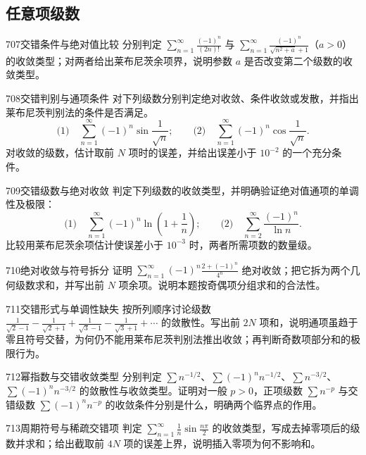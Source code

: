 \subsection{任意项级数}
\begin{exercise}{707}{交错条件与绝对值比较}
分别判定 $\sum_{n=1}^{\infty}\frac{(-1)^n}{(2n)!}$ 与 $\sum_{n=1}^{\infty}\frac{(-1)^n}{\sqrt{n^2+a}+1}$（$a>0$）的收敛类型；对两者给出莱布尼茨余项界，说明参数 $a$ 是否改变第二个级数的收敛类型。
\end{exercise}
\begin{exercise}{708}{交错判别与通项条件}
对下列级数分别判定绝对收敛、条件收敛或发散，并指出莱布尼茨判别法的条件是否满足。
\[\text{(1)}\quad\sum_{n=1}^{\infty}(-1)^n\sin\frac1{\sqrt n};\qquad
\text{(2)}\quad\sum_{n=1}^{\infty}(-1)^n\cos\frac1{\sqrt n}.\]
对收敛的级数，估计取前 $N$ 项时的误差，并给出误差小于 $10^{-2}$ 的一个充分条件。
\end{exercise}
\begin{exercise}{709}{交错级数与绝对收敛}
判定下列级数的收敛类型，并明确验证绝对值通项的单调性及极限：
\[\text{(1)}\quad\sum_{n=1}^{\infty}(-1)^n\ln\left(1+\frac1n\right);\qquad
\text{(2)}\quad\sum_{n=2}^{\infty}\frac{(-1)^n}{\ln n}.\]
比较用莱布尼茨余项估计使误差小于 $10^{-3}$ 时，两者所需项数的数量级。
\end{exercise}
\begin{exercise}{710}{绝对收敛与符号拆分}
证明 $\sum_{n=1}^{\infty}(-1)^n\frac{2+(-1)^n}{4^n}$ 绝对收敛；把它拆为两个几何级数求和，并写出前 $N$ 项余项。说明本题按奇偶项分组求和的合法性。
\end{exercise}
\begin{exercise}{711}{交错形式与单调性缺失}
按所列顺序讨论级数 $\frac1{\sqrt2-1}-\frac1{\sqrt2+1}+\frac1{\sqrt3-1}-\frac1{\sqrt3+1}+\cdots$ 的敛散性。写出前 $2N$ 项和，说明通项虽趋于零且符号交替，为何仍不能用莱布尼茨判别法推出收敛；再判断奇数项部分和的极限行为。
\end{exercise}
\begin{exercise}{712}{幂指数与交错收敛类型}
分别判定 $\sum n^{-1/2}$、$\sum(-1)^nn^{-1/2}$、$\sum n^{-3/2}$、$\sum(-1)^nn^{-3/2}$ 的敛散性与收敛类型。证明对一般 $p>0$，正项级数 $\sum n^{-p}$ 与交错级数 $\sum(-1)^nn^{-p}$ 的收敛条件分别是什么，明确两个临界点的作用。
\end{exercise}
\begin{exercise}{713}{周期符号与稀疏交错项}
判定 $\sum_{n=1}^{\infty}\frac1n\sin\frac{n\pi}2$ 的收敛类型，写成去掉零项后的级数并求和；给出截取前 $4N$ 项的误差上界，说明插入零项为何不影响和。
\end{exercise}
